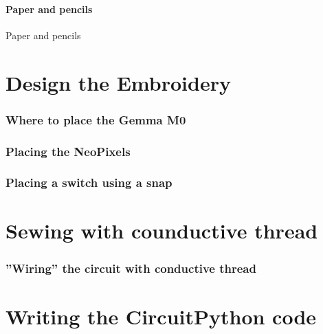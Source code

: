 \documentclass{beamer}
\begin{document}
\subsection{Paper and pencils}
\begin{frame}[fragile]{Paper and pencils}
\end{frame}
\part{Design the Embroidery}
\section{Where to place the Gemma M0} 
\frame{\tableofcontents[hideothersubsections,sectionstyle=show/hide]}
\section{Placing the NeoPixels}
\frame{\tableofcontents[hideothersubsections,sectionstyle=show/hide]}
\section{Placing a switch using a snap}
\frame{\tableofcontents[hideothersubsections,sectionstyle=show/hide]}
\part{Sewing with counductive thread}
\section{''Wiring'' the circuit with conductive thread}
\frame{\tableofcontents[hideothersubsections,sectionstyle=show/hide]}
\part{Writing the CircuitPython code}
\end{document}
